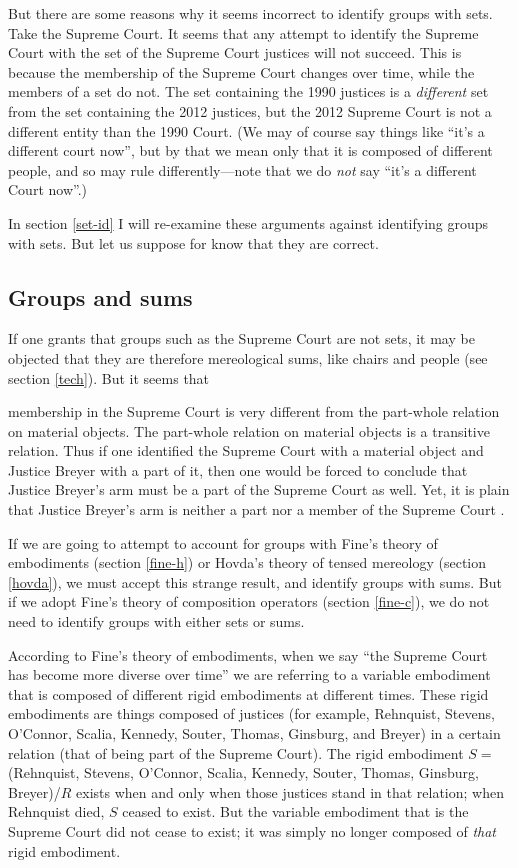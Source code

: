 \documentclass[11pt]{article}
\newenvironment{squote}{%
\begin{spacing}{1}
\begin{list}{}{%
\setlength{\labelwidth}{0pt}%
\rightmargin\leftmargin%
}
\item\relax
}{%
\end{list}%
\end{spacing}
}
\begin{document}
\begin{spacing}{1.5}
But there are some reasons why it seems incorrect to identify groups
with sets.  Take the Supreme Court.  It seems that any attempt to
identify the Supreme Court with the set of the Supreme Court justices
will not succeed.  This is because the membership of the Supreme Court
changes over time, while the members of a set do not.  The set
containing the 1990 justices is a {\em different} set from the set
containing the 2012 justices, but the 2012 Supreme Court is not a
different entity than the 1990 Court.  (We may of course say things
like ``it's a different court now'', but by that we mean only that it
is composed of different people, and so may rule differently---note
that we do {\em not} say ``it's a different Court now''.)

In section \ref{set-id} I will re-examine these arguments against
identifying groups with sets.  But let us suppose for know that they
are correct.

\subsection{Groups and sums}
\label{group-sum}
If one grants that groups such as the Supreme Court are not sets, it
may be objected that they are therefore mereological sums, like chairs
and people (see section \ref{tech}).  But it seems that

\begin{squote}
membership in the Supreme Court is very different from
the part-whole relation on material objects.  The part-whole relation
on material objects is a transitive relation.  Thus if one identified
the Supreme Court with a material object and Justice Breyer with a
part of it, then one would be forced to conclude that Justice Breyer's
arm must be a part of the Supreme Court as well.  Yet, it is plain
that Justice Breyer's arm is neither a part nor a member of the
Supreme Court \citep[136--137]{uzquiano2004a}.
\end{squote}

If we are going to attempt to account for groups with Fine's theory of
embodiments (section \ref{fine-h}) or Hovda's theory of tensed
mereology (section \ref{hovda}), we must accept this strange result,
and identify groups with sums.  But if we adopt Fine's theory of
composition operators (section \ref{fine-c}), we do not need to
identify groups with either sets or sums.

According to Fine's theory of embodiments, when we say ``the Supreme
Court has become more diverse over time'' we are referring to a
variable embodiment that is composed of different rigid embodiments at
different times.  These rigid embodiments are things composed of
justices (for example, Rehnquist, Stevens, O'Connor, Scalia, Kennedy,
Souter, Thomas, Ginsburg, and Breyer) in a certain relation (that of
being part of the Supreme Court).  The rigid embodiment $S =$
(Rehnquist, Stevens, O'Connor, Scalia, Kennedy, Souter, Thomas,
Ginsburg, Breyer)/$R$ exists when and only when those justices stand
in that relation; when Rehnquist died, $S$ ceased to exist.  But the
variable embodiment that is the Supreme Court did not cease to exist;
it was simply no longer composed of {\em that} rigid embodiment.


\end{spacing}
\end{document}
